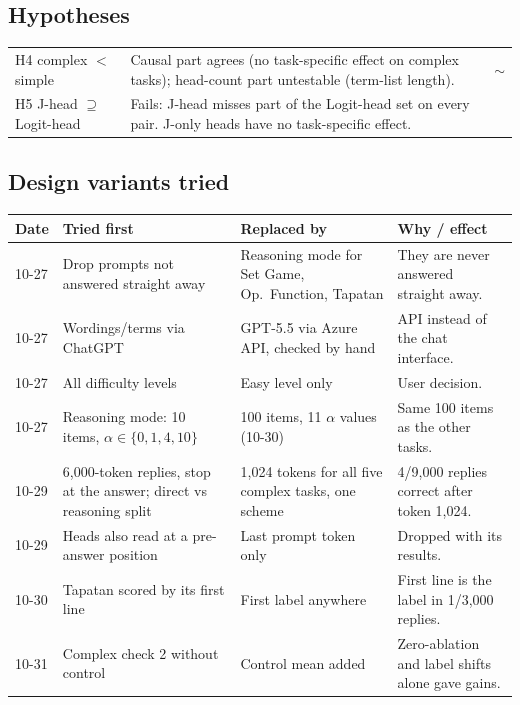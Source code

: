 \documentclass[10pt,a4paper]{article}
\newcommand{\no}{\textcolor{red!70!black}{\ding{55}}}
\newcommand{\mixed}{\textcolor{orange!80!black}{$\sim$}}
\begin{document}
\subsection{Hypotheses}

\begin{tabularx}{\textwidth}{@{}>{\raggedright\arraybackslash}p{3.6cm}Lc@{}}
\toprule
H4 complex $<$ simple & Causal part agrees (no task-specific effect on complex tasks); head-count part untestable (term-list length). & \mixed \\
H5 J-head $\supseteq$ Logit-head & Fails: J-head misses part of the Logit-head set on every pair. J-only heads have no task-specific effect. & \no \\
\bottomrule
\end{tabularx}

\subsection{Design variants tried}

\small
\begin{tabularx}{\textwidth}{@{}p{1.5cm}LLL@{}}
\toprule
\textbf{Date} & \textbf{Tried first} & \textbf{Replaced by} & \textbf{Why / effect} \\
-27 & Drop prompts not answered straight away & Reasoning mode for Set Game, Op.\ Function, Tapatan & They are never answered straight away. \\
10-27 & Wordings/terms via ChatGPT & GPT-5.5 via Azure API, checked by hand & API instead of the chat interface. \\
10-27 & All difficulty levels & Easy level only & User decision. \\
10-27 & Reasoning mode: 10 items, $\alpha\in\{0,1,4,10\}$ & 100 items, 11 $\alpha$ values (10-30) & Same 100 items as the other tasks. \\
10-29 & 6,000-token replies, stop at the answer; direct vs reasoning split & 1,024 tokens for all five complex tasks, one scheme & 4/9,000 replies correct after token 1,024. \\
10-29 & Heads also read at a pre-answer position & Last prompt token only & Dropped with its results. \\
10-30 & Tapatan scored by its first line & First label anywhere & First line is the label in 1/3,000 replies. \\
10-31 & Complex check 2 without control & Control mean added & Zero-ablation and label shifts alone gave gains. \\
\bottomrule
\end{tabularx}
\normalsize
\end{document}
